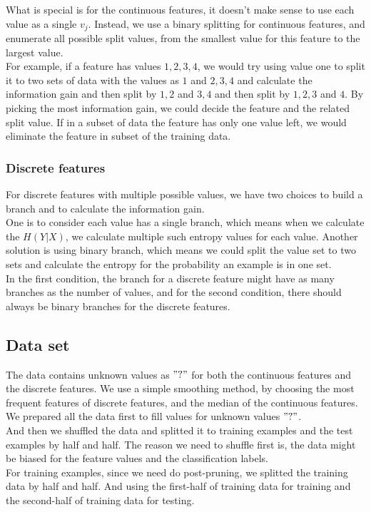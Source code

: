 \documentclass[11pt]{article}
\begin{document}
What is special is for the continuous features, it doesn't make sense to use each value as a single $v_j$.
Instead, we use a binary splitting for continuous features, and enumerate all possible split values, from the smallest value
for this feature to the largest value. \\
For example, if a feature has values $1, 2, 3, 4$, we would try using value one to split it to two sets of data
with the values as $1$ and $2, 3, 4$ and calculate the information gain and then split by $1, 2$ and $3, 4$ and then 
split by $1, 2, 3$ and $4$. By picking the most information gain, we could decide the feature and the related split value.
If in a subset of data the feature has only one value left, we would eliminate the feature in subset of the training data.

\subsubsection{Discrete features}

For discrete features with multiple possible values, we have two choices to build a branch and to calculate the information gain. \\
One is to consider each value has a single branch, which means when we calculate the $H(Y|X)$, we calculate multiple such entropy values for each value. Another solution is using binary branch, which means we could split the value set to two sets and calculate the entropy for the probability an example is in one set. \\
In the first condition, the branch for a discrete feature might have as many branches as the number of values, and for the second condition, there should always be binary branches for the discrete features.

\subsection{Data set}

The data contains unknown values as $"?"$ for both the continuous features and the discrete features. We use a simple smoothing method,
by choosing the most frequent features of discrete features, and the median of the continuous features. \\
We prepared all the data first to fill values for unknown values $"?"$. \\
And then we shuffled the data and splitted it to training examples and the test examples by half and half. The reason we
need to shuffle first is, the data might be biased for the feature values and the classification labels. \\
For training examples, since we need do post-pruning, we splitted the training data by half and half. And using the first-half
of training data for training and the second-half of training data for testing.
\end{document}
